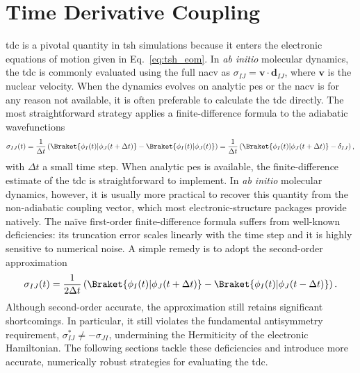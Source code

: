 \section{Time Derivative Coupling}\label{sec:time_derivative_coupling}
\acrshort{tdc} is a pivotal quantity in \acrshort{tsh} simulations because it enters the electronic equations of motion given in Eq.~\eqref{eq:tsh_eom}. In \textit{ab initio} molecular dynamics, the \acrshort{tdc} is commonly evaluated using the full \acrshort{nacv} as $\sigma_{IJ}=\symbf{v}\cdot\symbf{d}_{IJ}$, where $\symbf{v}$ is the nuclear velocity. When the dynamics evolves on analytic \acrshort{pes} or the \acrshort{nacv} is for any reason not available, it is often preferable to calculate the \acrshort{tdc} directly. The most straightforward strategy applies a finite-difference formula to the adiabatic wavefunctions
\begin{equation}\label{eq:tdc_fd1}
\sigma_{IJ}(t)=\frac{1}{\Delta t}\left(\Braket{\phi_I(t)\vert\phi_J(t+\Delta t)}-\Braket{\phi_I(t)\vert\phi_J(t)}\right)=\frac{1}{\Delta t}\left(\Braket{\phi_I(t)\vert\phi_J(t+\Delta t)}-\delta_{IJ}\right),
\end{equation}
with $\Delta t$ a small time step. When analytic \acrshort{pes} is available, the finite-difference estimate of the \acrshort{tdc} is straightforward to implement. In \textit{ab initio} molecular dynamics, however, it is usually more practical to recover this quantity from the non-adiabatic coupling vector, which most electronic-structure packages provide natively. The naïve first-order finite-difference formula suffers from well-known deficiencies: its truncation error scales linearly with the time step and it is highly sensitive to numerical noise. A simple remedy is to adopt the second-order approximation
\begin{equation}\label{eq:tdc_fd2}
\sigma_{IJ}(t)=\frac{1}{2\Delta t}\left(\Braket{\phi_I(t)\vert\phi_J(t+\Delta t)}-\Braket{\phi_I(t)\vert\phi_J(t-\Delta t)}\right).
\end{equation}
Although second-order accurate, the approximation still retains significant shortcomings. In particular, it still violates the fundamental antisymmetry requirement, $\sigma_{IJ}^\ast\neq-\sigma_{JI}$, undermining the Hermiticity of the electronic Hamiltonian. The following sections tackle these deficiencies and introduce more accurate, numerically robust strategies for evaluating the \acrshort{tdc}.
